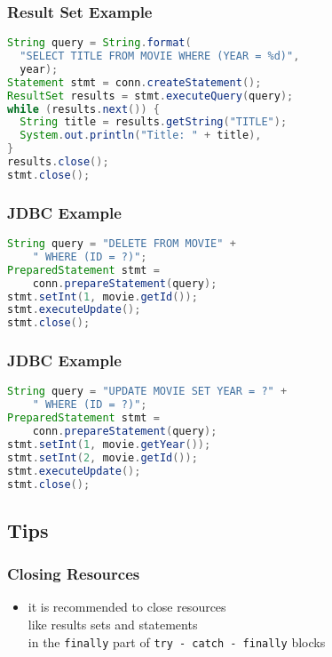 \documentclass[dvipsnames]{beamer}
\theoremstyle{plain}
\begin{document}
\begin{frame}[fragile]
  \frametitle{Result Set Example}

  \begin{example}
    \begin{lstlisting}[language=Java]
String query = String.format(
  "SELECT TITLE FROM MOVIE WHERE (YEAR = %d)",
  year);
Statement stmt = conn.createStatement();
ResultSet results = stmt.executeQuery(query);
while (results.next()) {
  String title = results.getString("TITLE");
  System.out.println("Title: " + title),
}
results.close();
stmt.close();
    \end{lstlisting}
  \end{example}
\end{frame}

\begin{frame}[fragile]
  \frametitle{JDBC Example}

  \begin{example}[deleting]
    \begin{lstlisting}[language=Java]
String query = "DELETE FROM MOVIE" +
    " WHERE (ID = ?)";
PreparedStatement stmt =
    conn.prepareStatement(query);
stmt.setInt(1, movie.getId());
stmt.executeUpdate();
stmt.close();
    \end{lstlisting}
  \end{example}
\end{frame}

\begin{frame}[fragile]
  \frametitle{JDBC Example}

  \begin{example}[updating]
    \begin{lstlisting}[language=Java]
String query = "UPDATE MOVIE SET YEAR = ?" +
    " WHERE (ID = ?)";
PreparedStatement stmt =
    conn.prepareStatement(query);
stmt.setInt(1, movie.getYear());
stmt.setInt(2, movie.getId());
stmt.executeUpdate();
stmt.close();
    \end{lstlisting}
  \end{example}
\end{frame}

\subsection{Tips}

\begin{frame}
  \frametitle{Closing Resources}

  \begin{itemize}
    \item it is recommended to close resources\\
      like results sets and statements\\
      in the \lstinline!finally! part
      of \lstinline!try - catch - finally! blocks
  \end{itemize}
\end{frame}
\end{document}
